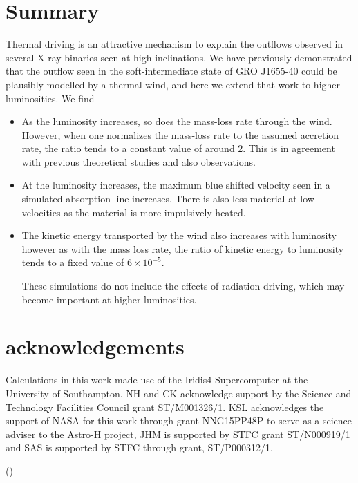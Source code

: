 \documentclass[a4paper,fleqn,usenatbib]{mnras}
\begin{document}
\section{Summary }

Thermal driving is an attractive mechanism to explain the outflows observed in several 
X-ray binaries seen at high inclinations. We have previously demonstrated that 
the outflow seen in the soft-intermediate state of GRO J1655-40 could be plausibly 
modelled by a thermal wind, and here we extend that work to higher luminosities. We find

\begin{itemize}
\item{As the luminosity increases, so does the mass-loss rate through the wind. However, 
when one normalizes the mass-loss rate to the assumed accretion rate, the ratio tends to 
a constant value of around 2. This is in agreement with previous theoretical studies and 
also observations.}
\item{At the luminosity increases, the maximum blue shifted velocity seen in a simulated 
absorption line increases. There is also less material at low velocities as the material 
is more impulsively heated.}
\item{The kinetic energy transported by the wind also increases with luminosity however 
as with the mass loss rate, the ratio of kinetic energy to luminosity tends to a fixed value
of $6\times10^{-5}$.}

These simulations do not include the effects of radiation driving, which may become
important at higher luminosities. 



\end{itemize}

\section{acknowledgements}
Calculations in this work made use of the Iridis4 Supercomputer at the University of Southampton.
NH and CK  acknowledge support by the Science and Technology Facilities Council grant ST/M001326/1. 
KSL acknowledges the support of NASA for this work through grant NNG15PP48P to serve as a 
science adviser to the Astro-H project, JHM is supported by STFC grant ST/N000919/1 and SAS 
is supported by STFC through grant, ST/P000312/1. 




()
\label{lastpage}

\bsp	%
\end{document}
